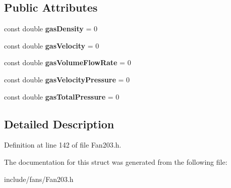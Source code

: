 \subsection*{Public Attributes}
\begin{DoxyCompactItemize}
\item 
\mbox{\label{struct_plane_data_1_1_node_binding_1_1_data_ab95d17426cc7d8141e904baf96a12340}} 
const double {\bfseries gas\+Density} = 0
\item 
\mbox{\label{struct_plane_data_1_1_node_binding_1_1_data_a334b80114bbe976623a7e24fbd546d51}} 
const double {\bfseries gas\+Velocity} = 0
\item 
\mbox{\label{struct_plane_data_1_1_node_binding_1_1_data_a5cbd28074d5a930f0267a9d60b83a04d}} 
const double {\bfseries gas\+Volume\+Flow\+Rate} = 0
\item 
\mbox{\label{struct_plane_data_1_1_node_binding_1_1_data_aa0892de35b2ecc840e2bcdca79f5d1a2}} 
const double {\bfseries gas\+Velocity\+Pressure} = 0
\item 
\mbox{\label{struct_plane_data_1_1_node_binding_1_1_data_a819380996458306f772c305df01d8dba}} 
const double {\bfseries gas\+Total\+Pressure} = 0
\end{DoxyCompactItemize}


\subsection{Detailed Description}


Definition at line 142 of file Fan203.\+h.



The documentation for this struct was generated from the following file\+:\begin{DoxyCompactItemize}
\item 
include/fans/Fan203.\+h\end{DoxyCompactItemize}
